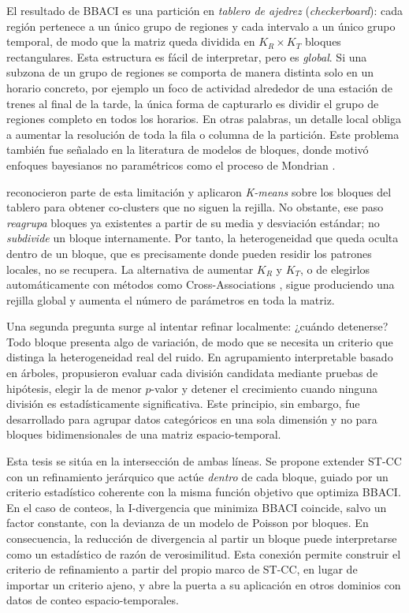 El resultado de \ac{BBACI} es una partición en \emph{tablero de ajedrez}
(\emph{checkerboard}): cada región pertenece a un único grupo de regiones y
cada intervalo a un único grupo temporal, de modo que la matriz queda
dividida en $K_R \times K_T$ bloques rectangulares. Esta estructura es
fácil de interpretar, pero es \emph{global}. Si una subzona de un grupo de
regiones se comporta de manera distinta solo en un horario concreto, por
ejemplo un foco de actividad alrededor de una estación de trenes al final
de la tarde, la única forma de capturarlo es dividir el grupo de regiones
completo en todos los horarios. En otras palabras, un detalle local obliga
a aumentar la resolución de toda la fila o columna de la partición. Este
problema también fue señalado en la literatura de modelos de bloques, donde
motivó enfoques bayesianos no paramétricos como el proceso de Mondrian
\cite{Roy2008}.

\cite{Liu2021} reconocieron parte de esta limitación y aplicaron
\textit{K-means} sobre los bloques del tablero para obtener co-clusters que no
siguen la rejilla. No obstante, ese paso \emph{reagrupa} bloques ya
existentes a partir de su media y desviación estándar; no \emph{subdivide}
un bloque internamente. Por tanto, la heterogeneidad que queda oculta dentro
de un bloque, que es precisamente donde pueden residir los patrones locales,
no se recupera. La alternativa de aumentar $K_R$ y $K_T$, o de elegirlos
automáticamente con métodos como Cross-Associations \cite{Chakrabarti2004},
sigue produciendo una rejilla global y aumenta el número de parámetros en
toda la matriz.

Una segunda pregunta surge al intentar refinar localmente: ¿cuándo detenerse?
Todo bloque presenta algo de variación, de modo que se necesita un criterio
que distinga la heterogeneidad real del ruido. En agrupamiento interpretable
basado en árboles, \cite{Hu2025} propusieron evaluar cada división candidata
mediante pruebas de hipótesis, elegir la de menor $p$-valor y detener el
crecimiento cuando ninguna división es estadísticamente significativa. Este
principio, sin embargo, fue desarrollado para agrupar datos categóricos en
una sola dimensión y no para bloques bidimensionales de una matriz
espacio-temporal.

Esta tesis se sitúa en la intersección de ambas líneas. Se propone extender
\ac{ST-CC} con un refinamiento jerárquico que actúe \emph{dentro} de cada
bloque, guiado por un criterio estadístico coherente con la misma función
objetivo que optimiza \ac{BBACI}. En el caso de conteos, la I-divergencia
que minimiza \ac{BBACI} coincide, salvo un factor constante, con la
devianza de un modelo de Poisson por bloques. En consecuencia, la reducción
de divergencia al partir un bloque puede interpretarse como un estadístico
de razón de verosimilitud. Esta conexión permite construir el criterio de
refinamiento a partir del propio marco de \ac{ST-CC}, en lugar de importar
un criterio ajeno, y abre la puerta a su aplicación en otros dominios con
datos de conteo espacio-temporales.

